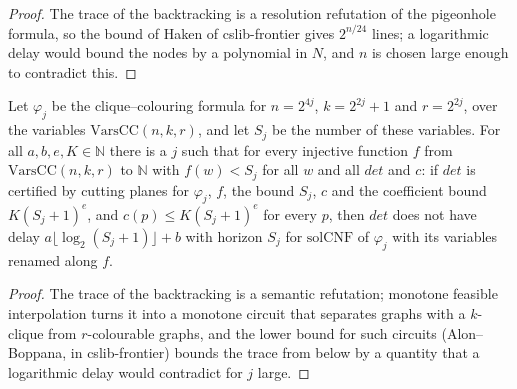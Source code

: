 \begin{proof}
  \leanok
  The trace of the backtracking is a resolution refutation of the pigeonhole formula, so the bound
  of Haken of cslib-frontier gives $2^{n/24}$ lines; a logarithmic delay would bound the nodes by a
  polynomial in $N$, and $n$ is chosen large enough to contradict this.
\end{proof}

\begin{theorem}
  \label{thm:search-cp-sin-demora-log}
  \leanok
  Let $\varphi_j$ be the clique--colouring formula for $n = 2^{4j}$, $k = 2^{2j} + 1$ and
  $r = 2^{2j}$, over the variables $\mathrm{VarsCC}(n, k, r)$, and let $S_j$ be the number of these
  variables. For all $a, b, e, K \in \mathbb{N}$ there is a $j$ such that for every injective
  function $f$ from $\mathrm{VarsCC}(n, k, r)$ to $\mathbb{N}$ with $f(w) < S_j$ for all $w$ and all
  $\mathit{det}$ and $c$: if $\mathit{det}$ is certified by cutting planes for $\varphi_j$, $f$, the
  bound $S_j$, $c$ and the coefficient bound $K (S_j + 1)^e$, and $c(p) \le K (S_j + 1)^e$ for every
  $p$, then $\mathit{det}$ does not have delay $a \lfloor \log_2 (S_j + 1) \rfloor + b$ with horizon
  $S_j$ for $\mathrm{solCNF}$ of $\varphi_j$ with its variables renamed along $f$.
  \own{}
\end{theorem}

\begin{proof}
  \leanok
  The trace of the backtracking is a semantic refutation; monotone feasible interpolation turns it
  into a monotone circuit that separates graphs with a $k$-clique from $r$-colourable graphs, and
  the lower bound for such circuits (Alon--Boppana, in cslib-frontier) bounds the trace from below
  by a quantity that a logarithmic delay would contradict for $j$ large.
\end{proof}

